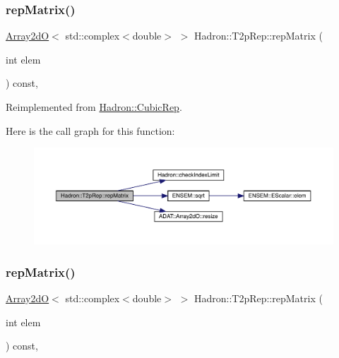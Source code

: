 \subsubsection{\texorpdfstring{repMatrix()}{repMatrix()}\hspace{0.1cm}{\footnotesize\ttfamily [1/3]}}
{\footnotesize\ttfamily \mbox{\hyperlink{classADAT_1_1Array2dO}{Array2dO}}$<$ std\+::complex$<$double$>$ $>$ Hadron\+::\+T2p\+Rep\+::rep\+Matrix (\begin{DoxyParamCaption}\item[{int}]{elem }\end{DoxyParamCaption}) const\hspace{0.3cm}{\ttfamily [inline]}, {\ttfamily [virtual]}}



Reimplemented from \mbox{\hyperlink{structHadron_1_1CubicRep_ac5d7e9e6f4ab1158b5fce3e4ad9e8005}{Hadron\+::\+Cubic\+Rep}}.

Here is the call graph for this function\+:
\nopagebreak
\begin{figure}[H]
\begin{center}
\leavevmode
\includegraphics[width=350pt]{d8/d6b/structHadron_1_1T2pRep_a9800949d2a6f8dcd4dd356947cae0488_cgraph}
\end{center}
\end{figure}
\mbox{\label{structHadron_1_1T2pRep_a9800949d2a6f8dcd4dd356947cae0488}} 
\subsubsection{\texorpdfstring{repMatrix()}{repMatrix()}\hspace{0.1cm}{\footnotesize\ttfamily [2/3]}}
{\footnotesize\ttfamily \mbox{\hyperlink{classADAT_1_1Array2dO}{Array2dO}}$<$ std\+::complex$<$double$>$ $>$ Hadron\+::\+T2p\+Rep\+::rep\+Matrix (\begin{DoxyParamCaption}\item[{int}]{elem }\end{DoxyParamCaption}) const\hspace{0.3cm}{\ttfamily [inline]}, {\ttfamily [virtual]}}



